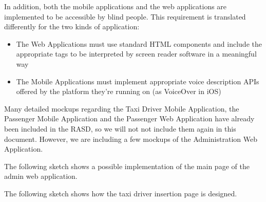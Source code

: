 In addition, both the mobile applications and the web applications are implemented to be accessible by blind people. This requirement is translated differently for the two kinds of application:
	\begin{itemize}
	\item The Web Applications must use standard HTML components and include the appropriate tags to be interpreted by screen reader software in a meaningful way
	\item The Mobile Applications must implement appropriate voice description APIs offered by the platform they're running on (as VoiceOver in iOS)
	\end{itemize}

Many detailed mockups regarding the Taxi Driver Mobile Application, the Passenger Mobile Application and the Passenger Web Application have already been included in the RASD, so we will not not include them again in this document. 
However, we are including a few mockups of the Administration Web Application. 

The following sketch shows a possible implementation of the main page of the admin web application. 
\begin{figure}[H]
\centering
{}
\end{figure}
\pagebreak
The following sketch shows how the taxi driver insertion page is designed. 
\begin{figure}[H]
\centering
{}
\end{figure}

